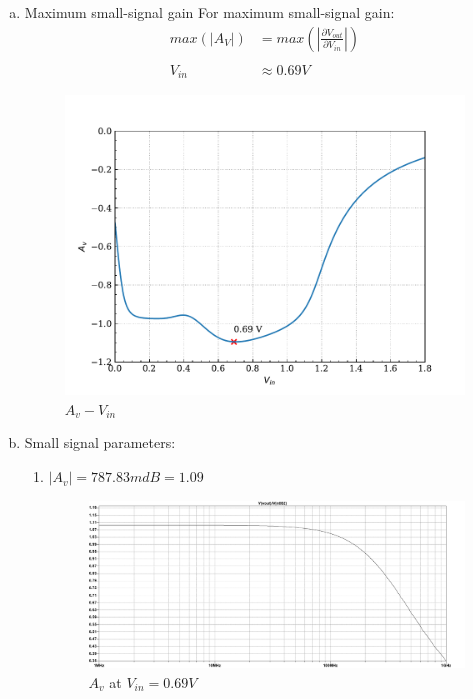 \documentclass{article}
\begin{document}
\begin{enumerate}[(a)]
\item Maximum small-signal gain
For maximum small-signal gain:
\begin{equation*}
\begin{align}
max(|A_{V}|) &= max(|\frac{\partial{V_{out}}}{\partial{V_{in}}}|) \\
\\
V_{in} &\approx 0.69 V
\end{align}
\end{equation*}
\begin{figure}[H]
\centering
\includegraphics[width=.9\linewidth]{img/q7/c/cir1-d-vout.pdf}
\caption{\label{fig:cir1-dvout}\(A_{v}-V_{in}\)}
\end{figure}
\item Small signal parameters:
\begin{enumerate}[1.]
\item \(|A_{v}| = 787.83mdB = 1.09\)
\begin{figure}[H]
\centering
\includegraphics[width=.9\linewidth]{img/q7/d/cir1-gain.pdf}
\caption{\label{fig:cir1-gain}\(A_{v}\) at \(V_{in} = 0.69V\)}
\end{figure}


\end{enumerate}
\end{enumerate}
\end{document}
